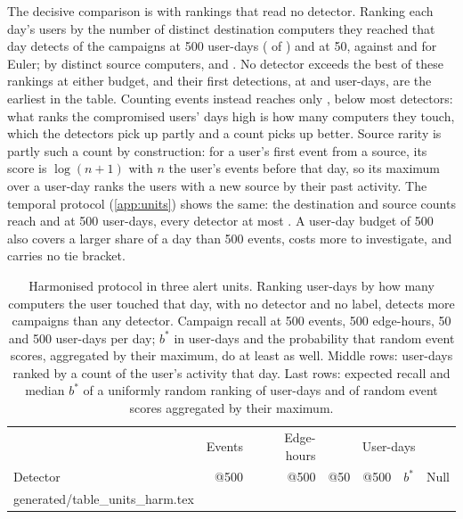 \documentclass[11pt,a4paper]{article}
\makeatletter
\newcommand{\tablerows}[1]{\@@input #1 }
\makeatother
\begin{document}
The decisive comparison is with rankings that read no detector. Ranking each day's users by the number of distinct destination computers they reached that day detects \HarmBaselineDstUserDayFiveHundred{} of the campaigns at 500 user-days (\HarmBaselineDstUserDayFiveHundredCount{} of \HarmTestCampaigns{}) and \HarmBaselineDstUserDayFifty{} at 50, against \HarmEulerUserDayFiveHundred{} and \HarmEulerUserDayFifty{} for Euler; by distinct source computers, \HarmBaselineSrcUserDayFiveHundred{} and \HarmBaselineSrcUserDayFifty{}. No detector exceeds the best of these rankings at either budget, and their first detections, at \HarmBaselineSrcUserDayFirst{} and \HarmBaselineDstUserDayFirst{} user-days, are the earliest in the table. Counting events instead reaches only \HarmBaselineEventsUserDayFiveHundred{}, below most detectors: what ranks the compromised users' days high is how many computers they touch, which the detectors pick up partly and a count picks up better. Source rarity is partly such a count by construction: for a user's first event from a source, its score is $\log(n+1)$ with $n$ the user's events before that day, so its maximum over a user-day ranks the users with a new source by their past activity. The temporal protocol (\cref{app:units}) shows the same: the destination and source counts reach \TempBaselineDstUserDayFiveHundred{} and \TempBaselineSrcUserDayFiveHundred{} at 500 user-days, every detector at most \TempPcaUserDayFiveHundred{}. A user-day budget of 500 also covers a larger share of a day than 500 events, costs more to investigate, and carries no tie bracket.

\begin{table}[t]
\centering
\footnotesize
\begin{threeparttable}
\caption{Harmonised protocol in three alert units. Ranking user-days by how many computers the user touched that day, with no detector and no label, detects more campaigns than any detector. Campaign recall at 500 events, 500 edge-hours, 50 and 500 user-days per day; $b^{*}$ in user-days and the probability that random event scores, aggregated by their maximum, do at least as well. Middle rows: user-days ranked by a count of the user's activity that day. Last rows: expected recall and median $b^{*}$ of a uniformly random ranking of user-days and of random event scores aggregated by their maximum.}
\label{tab:units}
\setlength{\tabcolsep}{4pt}
\begin{tabular}{@{}lrrrrrr@{}}
\toprule
& Events & Edge-hours & \multicolumn{4}{c}{User-days} \\
Detector & @500 & @500 & @50 & @500 & $b^{*}$ & Null \\
\midrule
\tablerows{generated/table_units_harm.tex}
\bottomrule
\end{tabular}
\end{threeparttable}
\end{table}
\end{document}
